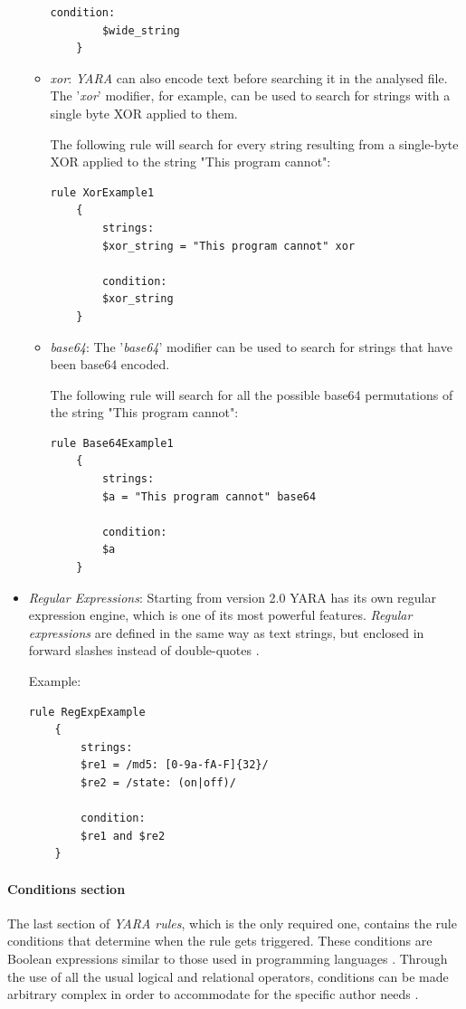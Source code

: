 \documentclass[pdfa%
,cucitura%
]{toptesi}
\begin{document}
\begin{itemize}
\begin{itemize}
\begin{lstlisting}[caption={YARA Wide Character Strings}, label=code:YaraWideCharacter, language=YARA, style=mystyle]
		condition:
		$wide_string
	}
		\end{lstlisting}
	
		\item \textit{xor}: \textit{YARA} can also encode text before searching it in the analysed file. The '\textit{xor}' modifier, for example, can be used to search for strings with a single byte XOR applied to them.
		
		The following rule will search for every string resulting from a single-byte XOR applied to the string "This program cannot":
		\begin{lstlisting}[caption={YARA XOR-ed Strings}, label=code:YaraXOR, language=YARA, style=mystyle]
	rule XorExample1
	{
		strings:
		$xor_string = "This program cannot" xor
		
		condition:
		$xor_string
	}
		\end{lstlisting}
	
		\item \textit{base64}: The '\textit{base64}' modifier can be used to search for strings that have been base64 encoded.
		
		The following rule will search for all the possible base64 permutations of the string "This program cannot":
		\begin{lstlisting}[caption={YARA Base64 encoded Strings}, label=code:YaraBase64, language=YARA, style=mystyle]
	rule Base64Example1
	{
		strings:
		$a = "This program cannot" base64
		
		condition:
		$a
	}
		\end{lstlisting}
	\end{itemize}

	\item \textit{Regular Expressions}:
	Starting from version 2.0 YARA has its own regular expression engine, which is one of its most powerful features. \textit{Regular expressions} are defined in the same way as text strings, but enclosed in forward slashes instead of double-quotes \cite{NaikEAGYRETE}.
	
	Example:		
	\begin{lstlisting}[caption={YARA Regular Expression}, label=code:YaraRegex, language=YARA, style=mystyle]
	rule RegExpExample
	{
		strings:
		$re1 = /md5: [0-9a-fA-F]{32}/
		$re2 = /state: (on|off)/
		
		condition:
		$re1 and $re2
	}
	\end{lstlisting}	
\end{itemize}

\paragraph{Conditions section}
The last section of \textit{YARA rules}, which is the only required one, contains the rule conditions that determine when the rule gets triggered. These conditions are Boolean expressions similar to those used in programming languages \cite{ArntzEYR}. Through the use of all the usual logical and relational operators, conditions can be made arbitrary complex in order to accommodate for the specific author needs \cite{SimonWIY}.	
\end{document}
